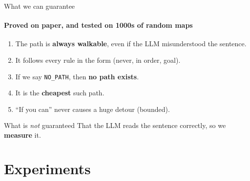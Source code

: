 \documentclass[aspectratio=169]{beamer}
\newcommand{\nopath}{\texttt{NO\_PATH}}
\begin{document}
\begin{frame}{What we can guarantee}
  \framesubtitle{Proved on paper, and tested on 1000s of random maps}
  \begin{enumerate}
    \item The path is \textbf{always walkable}, even if the LLM misunderstood
      the sentence.
    \item It follows every rule in the form (never, in order, goal).
    \item If we say \nopath, then \textbf{no path exists}.
    \item It is the \textbf{cheapest} such path.
    \item ``If you can'' never causes a huge detour (bounded).
  \end{enumerate}
  \vspace{0.8em}
  \begin{alertblock}{What is \emph{not} guaranteed}
    That the LLM reads the sentence correctly, so we \textbf{measure} it.
  \end{alertblock}
\end{frame}

\section{Experiments}
\end{document}
